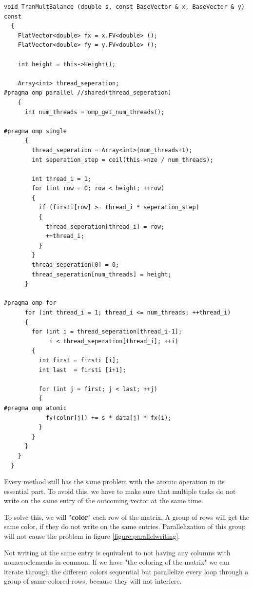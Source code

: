 \documentclass[a4paper,11pt]{scrartcl}
\begin{document}
\begin{lstlisting}
void TranMultBalance (double s, const BaseVector & x, BaseVector & y) const
  {
    FlatVector<double> fx = x.FV<double> ();
    FlatVector<double> fy = y.FV<double> ();

    int height = this->Height();

    Array<int> thread_seperation;
#pragma omp parallel //shared(thread_seperation)
    {
      int num_threads = omp_get_num_threads();

#pragma omp single
      {
        thread_seperation = Array<int>(num_threads+1);
        int seperation_step = ceil(this->nze / num_threads);

        int thread_i = 1;
        for (int row = 0; row < height; ++row)
        {
          if (firsti[row] >= thread_i * seperation_step)
          {
            thread_seperation[thread_i] = row;
            ++thread_i;
          }
        }
        thread_seperation[0] = 0;
        thread_seperation[num_threads] = height;
      }

#pragma omp for
      for (int thread_i = 1; thread_i <= num_threads; ++thread_i)
      {
        for (int i = thread_seperation[thread_i-1];
             i < thread_seperation[thread_i]; ++i)
        {
          int first = firsti [i];
          int last  = firsti [i+1];

          for (int j = first; j < last; ++j)
          {
#pragma omp atomic
            fy(colnr[j]) += s * data[j] * fx(i);
          }
        }
      }
    }
  }

\end{lstlisting}

Every method still has the same problem with the atomic operation in its
essential part. To avoid this, we have to make sure that multiple tasks do not
write on the same entry of the outcoming vector at the same time.

To solve this,
 we will "\textbf{color}" each row of the matrix. A group of rows will get the same
color, if they do not write on the same entries. Parallelization of this group
will not cause the problem in figure \ref{figure:parallelwriting}.

Not writing at the same entry is equivalent to not having
any columns with nonzeroelements in common. If we have "the coloring of
the matrix" we
 can iterate through the different colors sequential but parallelize every 
loop through a group of same-colored-rows, because they will not interfere.
\end{document}
